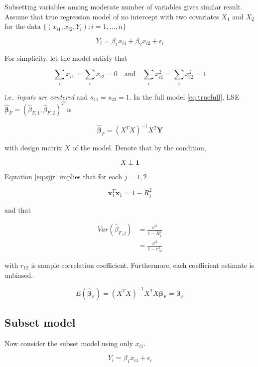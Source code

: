 \documentclass[]{book}
\theoremstyle{definition}
\theoremstyle{definition}
\theoremstyle{definition}
\theoremstyle{remark}
\begin{document}
Subsetting variables among moderate number of variables gives similar result. Assume that true regression model of no intercept with two covariates \(X_1\) and \(X_2\) for the data \(\{ (x_{i1}, x_{i2}, Y_i) : i = 1, \ldots, n \}\)

\begin{equation}
  Y_i = \beta_1 x_{i1} + \beta_2 x_{i2} + \epsilon_i
  \label{eq:truefull}
\end{equation}

For simplicity, let the model satisfy that

\[\sum_i x_{i1} = \sum_i x_{i2} = 0 \quad \text{and} \quad \sum_i x_{i1}^2 = \sum_i x_{i2}^2 = 1\]

i.e.~\emph{inputs are centered} and \(s_{11} = s_{22} = 1\). In the full model \eqref{eq:truefull}, LSE \(\boldsymbol{\hat\beta}_{F} = (\hat\beta_{F,1}, \hat\beta_{F, 2})^T\) is

\[\boldsymbol{\hat\beta}_{F} = (X^T X)^{-1} X^T \mathbf{Y}\]

with design matrix \(X\) of the model. Denote that by the condition,

\[X \perp \mathbf{1}\]

Equation \eqref{eq:sjjr} implies that for each \(j = 1, 2\)

\[\mathbf{x}_1^T \mathbf{x}_1 = 1 - R_j^2\]

and that

\begin{equation}
  \begin{split}
    Var(\hat\beta_{F,j}) & = \frac{\sigma^2}{1 - R_j^2} \\
    & = \frac{\sigma^2}{1 - r_{12}^2}
  \end{split}
  \label{eq:fullbetavar}
\end{equation}

with \(r_{12}\) is sample correlation coefficient. Furthermore, each coefficient estimate is unbiased.

\[E(\boldsymbol{\hat\beta}_{F}) = (X^T X)^{-1} X^T X \boldsymbol\beta_{F} = \boldsymbol\beta_{F}\]

\hypertarget{subset-model}{%
\subsection{Subset model}\label{subset-model}}

Now consider the subset model using only \(x_{i1}\).

\begin{equation}
  Y_i = \beta_1 x_{i1} + \epsilon_i
  \label{eq:truefull2}
\end{equation}
\end{document}
